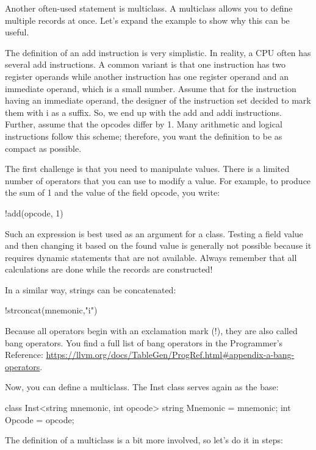 Another often-used statement is multiclass. A multiclass allows you to define multiple records at once. Let’s expand the example to show why this can be useful.

The definition of an add instruction is very simplistic. In reality, a CPU often has several add instructions. A common variant is that one instruction has two register operands while another instruction has one register operand and an immediate operand, which is a small number. Assume that for the instruction having an immediate operand, the designer of the instruction set decided to mark them with i as a suffix. So, we end up with the add and addi instructions. Further, assume that the opcodes differ by 1. Many arithmetic and logical instructions follow this scheme; therefore, you want the definition to be as compact as possible.

The first challenge is that you need to manipulate values. There is a limited number of operators that you can use to modify a value. For example, to produce the sum of 1 and the value of the field opcode, you write:

\begin{shell}
!add(opcode, 1)
\end{shell}

Such an expression is best used as an argument for a class. Testing a field value and then changing it based on the found value is generally not possible because it requires dynamic statements that are not available. Always remember that all calculations are done while the records are constructed!

In a similar way, strings can be concatenated:

\begin{shell}
!strconcat(mnemonic,"i")
\end{shell}

Because all operators begin with an exclamation mark (!), they are also called bang operators. You find a full list of bang operators in the Programmer’s Reference: \url{https://llvm.org/docs/TableGen/ProgRef.html#appendix-a-bang-operators}.

Now, you can define a multiclass. The Inst class serves again as the base:

\begin{shell}
class Inst<string mnemonic, int opcode> {
    string Mnemonic = mnemonic;
    int Opcode = opcode;
}
\end{shell}

The definition of a multiclass is a bit more involved, so let’s do it in steps:

